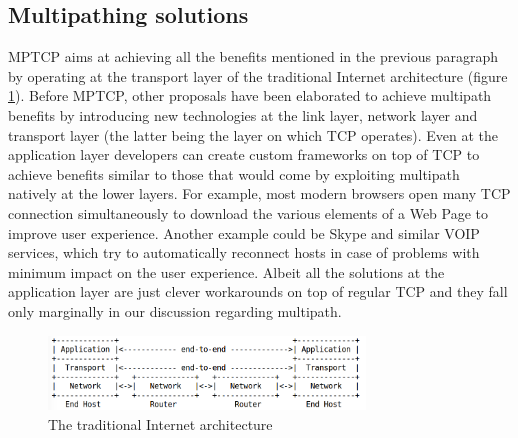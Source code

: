 \subsection{Multipathing solutions}
MPTCP aims at achieving all the benefits mentioned in the previous paragraph by operating at the transport layer of the traditional Internet architecture (figure \ref{fig:OSI}).
Before MPTCP, other proposals have been elaborated to achieve multipath benefits by introducing new technologies at the link layer, network layer and transport layer (the latter being the layer on which TCP operates). Even at the application layer developers can create custom frameworks on top of TCP to achieve benefits similar to those that would come by exploiting multipath natively at the lower layers. For example, most modern browsers open many TCP connection simultaneously to download the various elements of a Web Page to improve user experience. Another example could be Skype and similar VOIP services, which try to automatically reconnect hosts in case of problems with minimum impact on the user experience. Albeit all the solutions at the application layer are just clever workarounds on top of regular TCP and they fall only marginally in our discussion regarding multipath.

\begin{figure}[!htb]
\centering
\includegraphics[width=0.75\textwidth]{images/OSI}
\caption{The traditional Internet architecture}
\label{fig:OSI}
\end{figure}

